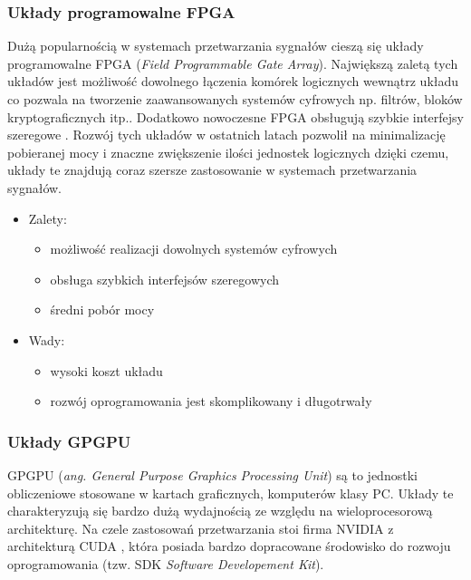 \subsubsection{Układy programowalne FPGA}
Dużą popularnością w systemach przetwarzania sygnałów cieszą się układy programowalne FPGA (\textit{Field Programmable Gate Array}). Największą zaletą tych układów jest możliwość dowolnego łączenia komórek logicznych wewnątrz układu co pozwala na tworzenie zaawansowanych systemów cyfrowych np. filtrów, bloków kryptograficznych itp..  Dodatkowo nowoczesne FPGA obsługują szybkie interfejsy szeregowe \cite{FPGA:GTP}. Rozwój tych układów w ostatnich latach pozwolił na minimalizację pobieranej mocy i znaczne zwiększenie ilości jednostek logicznych dzięki czemu, układy te znajdują coraz szersze zastosowanie w systemach przetwarzania sygnałów. 

\begin{itemize}
\item Zalety:
\begin{itemize}
\item możliwość realizacji dowolnych systemów cyfrowych
\item obsługa szybkich interfejsów szeregowych
\item średni pobór mocy
\end{itemize}

\item Wady:
\begin{itemize}
\item wysoki koszt układu
\item  rozwój oprogramowania jest skomplikowany i długotrwały
\end{itemize}

\end{itemize}

\subsubsection{Układy GPGPU}
GPGPU (\textit{ang. General Purpose Graphics Processing Unit}) są to jednostki obliczeniowe stosowane w kartach graficznych, komputerów klasy PC. Układy te charakteryzują się bardzo dużą wydajnością ze względu na wieloprocesorową architekturę. Na czele zastosowań przetwarzania stoi firma NVIDIA \cite{NVIDIA} z architekturą CUDA \cite{CUDA}, która posiada bardzo dopracowane środowisko do rozwoju oprogramowania (tzw. SDK \textit{Software Developement Kit}).  

